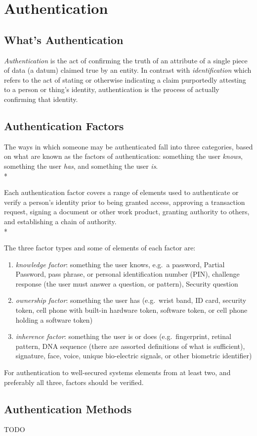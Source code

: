 
\chapter{Authentication}

\section{What's Authentication}

\emph{Authentication} is the act of confirming the truth of an attribute
of a single piece of data (a datum) claimed true by an entity. In
contrast with \emph{identification} which refers to the act of stating
or otherwise indicating a claim purportedly attesting to a person or
thing's identity, authentication is the process of actually confirming
that identity.


\section{Authentication Factors}

The ways in which someone may be authenticated fall into three
categories, based on what are known as the factors of authentication:
something the user \emph{knows}, something the user \emph{has}, and
something the user \emph{is}.\\*

Each authentication factor covers a range of elements used to
authenticate or verify a person's identity prior to being granted
access, approving a transaction request, signing a document or other
work product, granting authority to others, and establishing a chain of
authority.\\*


The three factor types and some of elements of each factor are:

\begin{enumerate}

    \item \emph{knowledge factor}: something the user knows, e.g.\ a 
        password, Partial Password, pass phrase, or personal identification 
        number (PIN), challenge response (the user must answer a question, 
        or pattern), Security question

    \item \emph{ownership factor}: something the user has (e.g.\ wrist band, 
        ID card, security token, cell phone with built-in hardware token, 
        software token, or cell phone holding a software token)

    \item \emph{inherence factor}: something the user is or does (e.g.\ 
        fingerprint, retinal pattern, DNA sequence (there are assorted 
        definitions of what is sufficient), signature, face, voice, 
        unique bio-electric signals, or other biometric identifier)

\end{enumerate}


For authentication to well-secured systems elements from at least two,
and preferably all three, factors should be verified.


\section{Authentication Methods}

TODO


